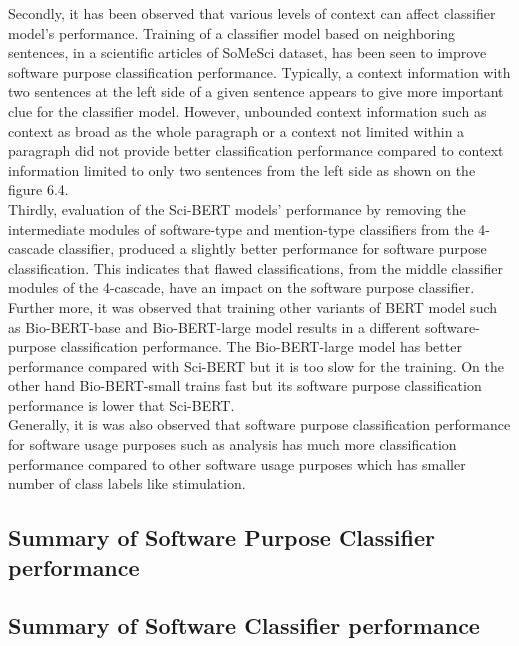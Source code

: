 Secondly, it has been observed that various levels of context can affect classifier model's performance. Training of a classifier model based on neighboring sentences, in a scientific articles of SoMeSci dataset, has been seen to improve software purpose classification performance. Typically, a context information with two sentences at the left side of a given sentence appears to give more important clue for the classifier model. However, unbounded context information such as context as broad as the whole paragraph or a context not limited within a paragraph did not provide better classification performance compared to context information limited to only two sentences from the left side as shown on the figure 6.4. \\


Thirdly, evaluation of the Sci-BERT models' performance by removing the intermediate modules of software-type and mention-type classifiers from the 4-cascade classifier, produced a slightly better performance for software purpose classification.  This indicates that flawed classifications, from the middle classifier modules of the 4-cascade, have an impact on the software purpose classifier. \\

Further more, it was observed that training other variants of BERT model such as Bio-BERT-base and Bio-BERT-large model results in a different software-purpose classification performance. The Bio-BERT-large model has better performance compared with Sci-BERT but it is too slow for the training. On the other hand Bio-BERT-small trains fast but its software purpose classification performance is lower that Sci-BERT. \\


Generally, it is was also observed that software purpose classification performance for software usage purposes such as analysis has much more classification performance compared to other software usage purposes which has smaller number of class labels like stimulation.   



\subsection{Summary of Software Purpose Classifier performance}
\label{sec:chapter06:summary_softPurpose}

\subsection{Summary of Software Classifier performance}
\label{sec:chapter06:summary_soft}



















